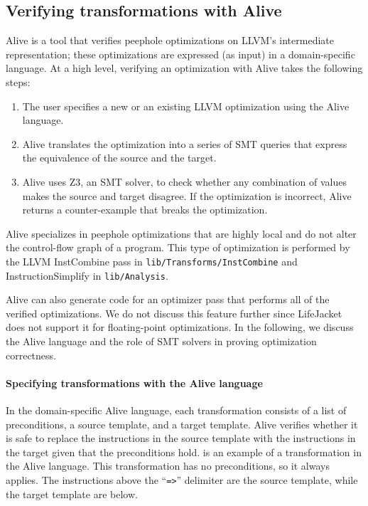 \documentclass[preprint, numbers]{sigplanconf}
\newcommand{\xxx}{LifeJacket}
\begin{document}
\subsection{Verifying transformations with Alive} \label{sec:alive}
Alive is a tool that verifies peephole optimizations on LLVM's intermediate
representation; these optimizations are expressed (as input) in a
domain-specific language. 
At a high level, verifying an optimization with Alive takes the following steps:

\begin{enumerate}

\item The user specifies a new or an existing LLVM optimization using the Alive
language.

\item Alive translates the optimization into a series of SMT queries that
express the equivalence of the source and the target.

\item Alive uses Z3, an SMT solver, to check whether any combination of values
makes the source and target disagree. If the optimization is incorrect, Alive
returns a counter-example that breaks the optimization.

\end{enumerate}

Alive specializes in peephole optimizations that are highly local and do not
alter the control-flow graph of a program. This type of optimization is
performed by the LLVM InstCombine pass in \texttt{lib/Transforms/InstCombine}
and InstructionSimplify in \texttt{lib/Analysis}.

Alive can also generate code for an optimizer pass that performs all of the
verified optimizations. We do not discuss this feature further since \xxx{}
does not support it for floating-point optimizations. In the following, we
discuss the Alive language and the role of SMT solvers in proving optimization
correctness.

\paragraph{Specifying transformations with the Alive language} In the
domain-specific Alive language, each transformation consists of a list of
preconditions, a source template, and a target template. Alive verifies whether
it is safe to replace the instructions in the source template with the
instructions in the target given that the preconditions hold. 
 is an example of a transformation in the Alive language. This
transformation has no preconditions, so it always applies. The instructions
above the ``\texttt{=>}'' delimiter are the source template, while the target
template are below.
\end{document}
